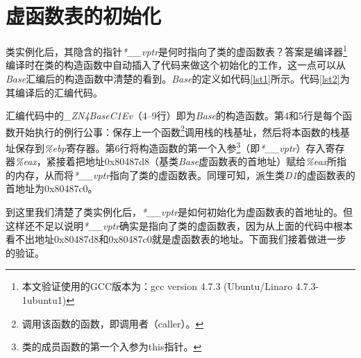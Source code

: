 \documentclass[a4paper, 12pt, titlepage]{article}
\begin{document}
\section{虚函数表的初始化}
类实例化后，其隐含的指针\emph{*\_\_vptr}是何时指向了类的虚函数表？答案是编译器\footnote{本文验证使用的GCC版本为：gcc version 4.7.3 (Ubuntu/Linaro 4.7.3-1ubuntu1)}编译时在类的构造函数中自动插入了代码来做这个初始化的工作，这一点可以从\emph{Base}汇编后的构造函数中清楚的看到。\emph{Base}的定义如代码\ref{lst1}所示。代码\ref{lst2}为其编译后的汇编代码。\newline
\begin{spacing}{1.0}
  
\end{spacing}

\begin{spacing}{1.0}
  Assembler}]{list/base.s}
\end{spacing}

汇编代码中的\emph{\_ZN4BaseC1Ev}（{\color{blue}4--9行}）即为\emph{Base}的构造函数。第4和5行是每个函数开始执行的例行公事：保存上一个函数\footnote{调用该函数的函数，即调用者（caller）。}调用栈的栈基址，然后将本函数的栈基址保存到\emph{\%ebp}寄存器。第6行将构造函数的第一个入参\footnote{类的成员函数的第一个入参为{\color{blue}this}指针。}（即\emph{*\_\_vptr}）存入寄存器\emph{\%eax}，紧接着把地址{\color{red}0x80487d8}（基类\emph{Base}虚函数表的首地址）赋给\emph{\%eax}所指的内存，从而将\emph{*\_\_vptr}指向了类的虚函数表。同理可知，派生类\emph{D1}的虚函数表的首地址为{\color{red}0x80487c0}。

到这里我们清楚了类实例化后，\emph{*\_\_vptr}是如何初始化为虚函数表的首地址的。但这样还不足以说明\emph{*\_\_vptr}确实是指向了类的虚函数表，因为从上面的代码中根本看不出地址{\color{red}0x80487d8}和{\color{red}0x80487c0}就是虚函数表的地址。下面我们接着做进一步的验证。
\end{document}
